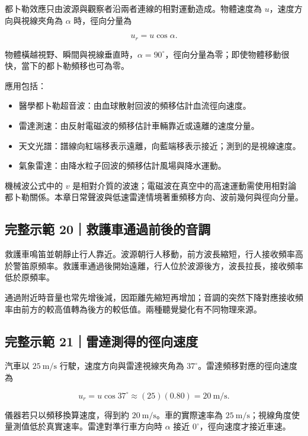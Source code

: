 \documentclass[11pt,a4paper]{article}
\providecommand{\tightlist}{%
  \setlength{\itemsep}{0pt}\setlength{\parskip}{0pt}}
\begin{document}
都卜勒效應只由波源與觀察者沿兩者連線的相對運動造成。物體速度為 \(u\)，速度方向與視線夾角為 \(\alpha\) 時，徑向分量為

\[
u_r=u\cos\alpha.
\]

物體橫越視野、瞬間與視線垂直時，\(\alpha=90^\circ\)，徑向分量為零；即使物體移動很快，當下的都卜勒頻移也可為零。

應用包括：

\begin{itemize}
\tightlist
\item
  醫學都卜勒超音波：由血球散射回波的頻移估計血流徑向速度。
\item
  雷達測速：由反射電磁波的頻移估計車輛靠近或遠離的速度分量。
\item
  天文光譜：譜線向紅端移表示遠離，向藍端移表示接近；測到的是視線速度。
\item
  氣象雷達：由降水粒子回波的頻移估計風場與降水運動。
\end{itemize}

機械波公式中的 \(v\) 是相對介質的波速；電磁波在真空中的高速運動需使用相對論都卜勒關係。本章日常聲波與低速雷達情境著重頻移方向、波前幾何與徑向分量。

\begin{HandoutWorkedExample}

\subsection{完整示範 20｜救護車通過前後的音調}\label{ux5b8cux6574ux793aux7bc4-20ux6551ux8b77ux8ecaux901aux904eux524dux5f8cux7684ux97f3ux8abf}

救護車鳴笛並朝靜止行人靠近。波源朝行人移動，前方波長縮短，行人接收頻率高於警笛原頻率。救護車通過後開始遠離，行人位於波源後方，波長拉長，接收頻率低於原頻率。

通過附近時音量也常先增後減，因距離先縮短再增加；音調的突然下降對應接收頻率由前方的較高值轉為後方的較低值。兩種聽覺變化有不同物理來源。

\end{HandoutWorkedExample}

\begin{HandoutWorkedExample}

\subsection{完整示範 21｜雷達測得的徑向速度}\label{ux5b8cux6574ux793aux7bc4-21ux96f7ux9054ux6e2cux5f97ux7684ux5f91ux5411ux901fux5ea6}

汽車以 \(25\ \mathrm{m/s}\) 行駛，速度方向與雷達視線夾角為 \(37^\circ\)。雷達頻移對應的徑向速度為

\[
u_r=u\cos37^\circ
\approx(25)(0.80)
=20\ \mathrm{m/s}.
\]

儀器若只以頻移換算速度，得到約 \(20\ \mathrm{m/s}\)。車的實際速率為 \(25\ \mathrm{m/s}\)；視線角度使量測值低於真實速率。雷達對準行車方向時 \(\alpha\) 接近 \(0^\circ\)，徑向速度才接近車速。

\end{HandoutWorkedExample}
\end{document}
